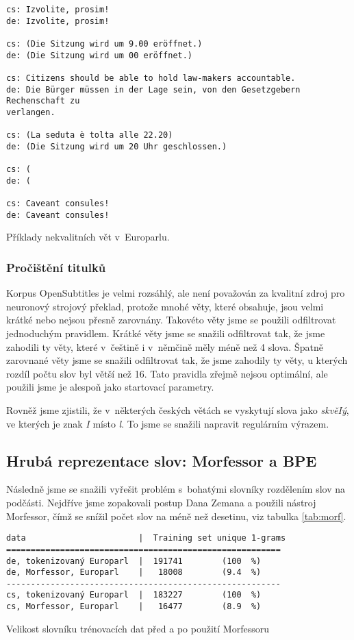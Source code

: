 \documentclass[a4]{article}
\begin{document}
\begin{table}[ht]
\begin{verbatim}
cs: Izvolite, prosim!
de: Izvolite, prosim!

cs: (Die Sitzung wird um 9.00 eröffnet.)
de: (Die Sitzung wird um 00 eröffnet.)

cs: Citizens should be able to hold law-makers accountable.
de: Die Bürger müssen in der Lage sein, von den Gesetzgebern Rechenschaft zu
verlangen.

cs: (La seduta è tolta alle 22.20)
de: (Die Sitzung wird um 20 Uhr geschlossen.)

cs: (
de: (

cs: Caveant consules!
de: Caveant consules!
\end{verbatim}
\caption{Příklady nekvalitních vět v~Europarlu.}
\label{tab:europarl}
\end{table}

\subsubsection{Pročištění titulků}

Korpus OpenSubtitles je velmi rozsáhlý, ale není považován za kvalitní
zdroj pro neuronový strojový překlad, protože mnohé věty, které obsahuje,
jsou velmi krátké nebo nejsou přesně zarovnány. Takovéto věty jsme se
použili odfiltrovat jednoduchým pravidlem. Krátké věty jsme se snažili
odfiltrovat tak, že jsme zahodili ty věty, které v~češtině i v~němčině měly
méně než 4 slova. Špatně zarovnané věty jsme se snažili odfiltrovat tak, že
jsme zahodily ty věty, u kterých rozdíl počtu slov byl větší než 16. Tato
pravidla zřejmě nejsou optimální, ale použili jsme je alespoň jako
startovací parametry.

Rovněž jsme zjistili, že v~některých českých větách se vyskytují slova jako
{\it skvěIý}, ve kterých je znak {\it I} místo {\it l}. To jsme se snažili
napravit regulárním výrazem.

\subsection{Hrubá reprezentace slov: Morfessor a BPE}

Následně jsme se snažili vyřešit problém s~bohatými slovníky rozdělením
slov na podčásti. Nejdříve jsme zopakovali postup Dana Zemana a použili
nástroj Morfessor\cite{morfessor}, čímž se snížil počet slov na méně než
desetinu, viz tabulka \ref{tab:morf}.


\begin{table}[ht]
\begin{verbatim}
data                       |  Training set unique 1-grams
========================================================
de, tokenizovaný Europarl  |  191741        (100  %)
de, Morfessor, Europarl    |   18008        (9.4  %)
--------------------------------------------------------
cs, tokenizovaný Europarl  |  183227        (100  %)
cs, Morfessor, Europarl    |   16477        (8.9  %)
\end{verbatim}
\caption{Velikost slovníku trénovacích dat před a po použití Morfessoru}
\label{tab:morf}
\end{table}
\end{document}
